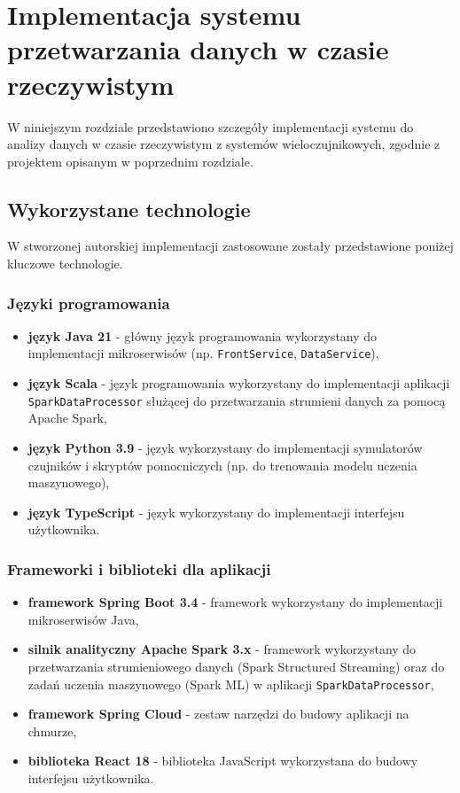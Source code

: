 \section{Implementacja systemu przetwarzania danych w czasie rzeczywistym}
\label{sec:implementacja_systemu}

W niniejszym rozdziale przedstawiono szczegóły implementacji systemu do analizy danych w czasie rzeczywistym z systemów wieloczujnikowych,
zgodnie z projektem opisanym w poprzednim rozdziale.

\subsection{Wykorzystane technologie}
\label{subsec:technologie}

W stworzonej autorskiej implementacji zastosowane zostały przedstawione poniżej kluczowe technologie.

\subsubsection{Języki programowania}
\label{subsubsec:jezyki_programowania}

\begin{itemize}
    \item \textbf{język Java 21} - główny język programowania wykorzystany do implementacji mikroserwisów (np. \texttt{FrontService}, \texttt{DataService}),
    \item \textbf{język Scala} - język programowania wykorzystany do implementacji aplikacji \texttt{SparkDataProcessor} służącej do przetwarzania strumieni danych za pomocą Apache Spark,
    \item \textbf{język Python 3.9} - język wykorzystany do implementacji symulatorów czujników i skryptów pomocniczych (np. do trenowania modelu uczenia maszynowego),
    \item \textbf{język TypeScript} - język wykorzystany do implementacji interfejsu użytkownika.
\end{itemize}

\subsubsection{Frameworki i biblioteki dla aplikacji}
\label{subsubsec:frameworki}

\begin{itemize}
    \item \textbf{framework Spring Boot 3.4} - framework wykorzystany do implementacji mikroserwisów Java,
    \item \textbf{silnik analityczny Apache Spark 3.x} \cite{spark_streaming} - framework wykorzystany do przetwarzania strumieniowego danych (Spark Structured Streaming) oraz do zadań uczenia maszynowego (Spark ML) w aplikacji \texttt{SparkDataProcessor},
    \item \textbf{framework Spring Cloud} - zestaw narzędzi do budowy aplikacji na chmurze,
    \item \textbf{biblioteka React 18} - biblioteka JavaScript wykorzystana do budowy interfejsu użytkownika.
\end{itemize}

